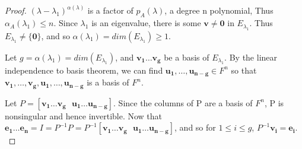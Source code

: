 \documentclass[a4paper,12pt]{article}
\renewcommand{\vec}[1]{\mathbf{#1}}
\begin{document}
\begin{proof}
  $(\lambda - \lambda_{1})^{\alpha(\lambda)}$ is a factor of $p_{A}(\lambda)$,
  a degree n polynomial, Thus $\alpha_{A}(\lambda_{1}) \leq n$. Since $\lambda_{1}$ is an eigenvalue, there is some $\vec{v} \neq \vec{0}$ in 
  $E_{\lambda_{1}}.$ Thus $E_{\lambda_{1}} \neq \{\vec{0}\}$, and so $\alpha(\lambda_{1}) =  dim(E_{\lambda_{1}}) \geq 1.$
  
  Let $g = \alpha(\lambda_{1}) = dim(E_{\lambda_{1}})$, and $\vec{v_{1}} \ldots \vec{v_{g}}$ 
  be a basis of $E_{\lambda_{1}}$. By the linear independence to basis theorem, we can find $\vec{u_{1}}, \ldots, \vec{u_{n-g}} \in F^{n}$
  so that $\vec{v_{1}}, \ldots, \vec{v_{g}}, \vec{u_{1}}, \ldots, \vec{u_{n-g}}$ is a basis of $F^{n}$.

   Let $P = [\vec{v_{1}} \ldots \vec{v_{g}} \text{ } \vec{u_{1}} \ldots \vec{u_{n-g}}]$. Since the
   columns of P are a basis of $F^{n}$, P is nonsingular and hence invertible.
   Now that $\vec{e_{1} \ldots \vec{e_{n}}} = I = P^{-1}P = P^{-1}[\vec{v_{1}} \ldots \vec{v_{g}} \text{ } \vec{u_{1}} \ldots \vec{u_{n-g}}]$,
   and so for $1 \leq i \leq g$, $P^{-1}\vec{v_{i}} = \vec{e_{i}}$. \\ 


\end{proof}
\end{document}
